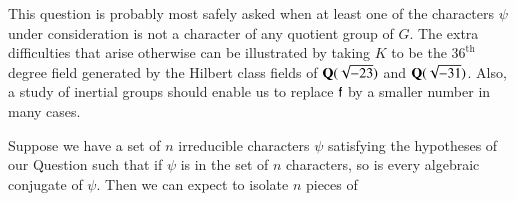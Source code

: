 This question is probably most safely asked when at least one of the
characters $\psi$ under consideration is not a character of any quotient group of $G$. The extra difficulties that arise otherwise can be illustrated by taking $K$ to be the $36^{\text{th}}$ degree field generated by the Hilbert class fields  of $\mathbf{Q} (\sqrt{-23})$ and $\mathbf{Q} (\sqrt{-31})$. Also, a study of inertial groups should enable us to replace $\mathsf{f}$ by a smaller number in many cases.

Suppose we have a set of $n$ irreducible characters $\psi$ satisfying the hypotheses of our Question such that if $\psi$ is in the set of $n$ characters, so is every algebraic conjugate of $\psi$. Then we can expect to isolate $n$ pieces of





